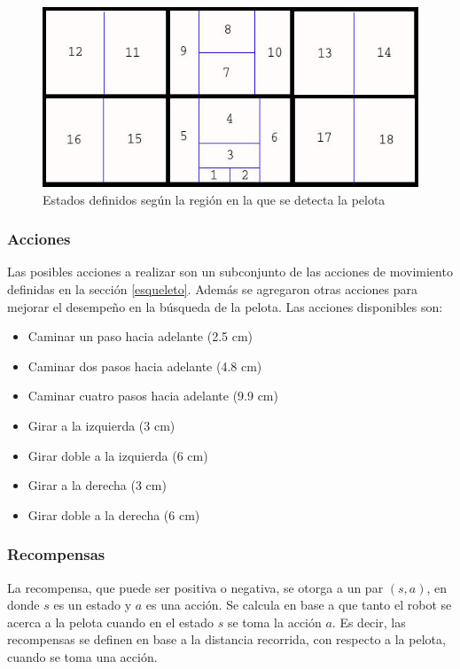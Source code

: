 \begin{figure}[hbtp]
\centering
\includegraphics[scale=0.5]{imagenes/Regiones2.jpg}
\caption{Estados definidos seg\'un la región en la que se detecta la pelota}
\label{fig:estados2}
\end{figure}


\subsubsection{Acciones}\label{sec:acciones}

Las posibles acciones a realizar son un subconjunto de las acciones de movimiento definidas en la sección \ref{esqueleto}. Además se agregaron otras acciones para mejorar el desempeño en la búsqueda de la pelota. Las acciones disponibles son:

\begin{itemize}
\item {Caminar un paso hacia adelante (2.5 cm)}
\item {Caminar dos pasos hacia adelante (4.8 cm)}
\item {Caminar cuatro pasos hacia adelante (9.9 cm)}
\item {Girar a la izquierda (3 cm)}
\item {Girar doble a la izquierda (6 cm)} 
\item {Girar a la derecha (3 cm) }
\item {Girar doble a la derecha (6 cm)}
\label{item:todaslasacciones}
\end{itemize}

\subsubsection{Recompensas}\label{recompensas}

La recompensa, que puede ser positiva o negativa, se otorga a un par $(s,a)$, en donde $s$ es un estado y $a$ es una acci\'on. Se calcula en base a que tanto el robot se acerca a la pelota cuando en el estado $s$ se toma la acci\'on $a$. Es decir, las recompensas se definen en base a la distancia recorrida, con respecto a la pelota, cuando se toma una acci\'on.  


